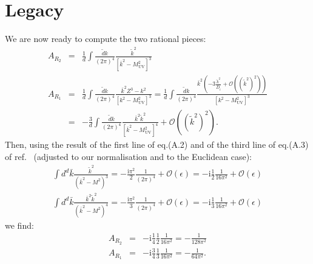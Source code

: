 \documentclass[11pt]{article}
\begin{document}






\section{Legacy}

We are now ready to compute the two rational pieces:
\begin{eqnarray}
A_{R_2}&=& \frac{1}{d} \int \frac{\tilde{d} k}{(2\pi)^4} \frac{ \tilde{k}^2 }{\left[ \bar{k}^2-M_\textrm{UV}^2\right]^3} \nonumber \\
A_{R_1} &=& \frac{1}{d} \int \frac{\tilde{d} k}{(2\pi)^4} \frac{ \bar{k}^2 Z^3 - k^2 }{\left[ k^2-M_\textrm{UV}^2\right]^3}
= \frac{1}{d} \int \frac{\tilde{d} k}{(2\pi)^4} \frac{ \bar{k}^2 \left( -3\frac{\tilde{k}^2}{\bar{D}_i} +\mathcal{O}\left((\tilde{k}^2)^2\right) \right) }{\left[ k^2-M_\textrm{UV}^2\right]^3} \nonumber \\
&=&  -\frac{3}{d} \int \frac{\tilde{d} k}{(2\pi)^4} \frac{ \bar{k}^2 \tilde{k}^2 }{\left[ \bar{k}^2-M_\textrm{UV}^2\right]^4} +\mathcal{O}\left((\tilde{k}^2)^2\right).
\end{eqnarray}
Then, using the result of the first line of eq.(A.2) and of the third line of eq.(A.3) of ref.~\cite{Draggiotis:2009yb} (adjusted to our normalisation and to the Euclidean case):
\begin{eqnarray}
\int d^d \bar{k} \frac{\tilde{k}^2}{\left( \bar{k}^2-M^2 \right)^3}=-\frac{\textrm{i}\pi^2}{2}\frac{1}{(2\pi)^4}+\mathcal{O}(\epsilon)=-\textrm{i}\frac{1}{2}\frac{1}{16 \pi^2}+\mathcal{O}(\epsilon) \nonumber\\
\int d^d \bar{k} \frac{\bar{k}^2 \tilde{k}^2}{\left( \bar{k}^2-M^2 \right)^4}=-\frac{\textrm{i}\pi^2}{3}\frac{1}{(2\pi)^4}+\mathcal{O}(\epsilon)=-\textrm{i}\frac{1}{3}\frac{1}{16 \pi^2}+\mathcal{O}(\epsilon)
\end{eqnarray}
we find:
\begin{eqnarray}
A_{R_2} &=&-\textrm{i}\frac{1}{4}\frac{1}{2}\frac{1}{16 \pi^2} = -\frac{1}{128 \pi^2} \nonumber\\
A_{R_1} &=& -\textrm{i}\frac{3}{4}\frac{1}{3}\frac{1}{16 \pi^2} = -\frac{1}{64 \pi^2}.
\end{eqnarray}
\end{document}
